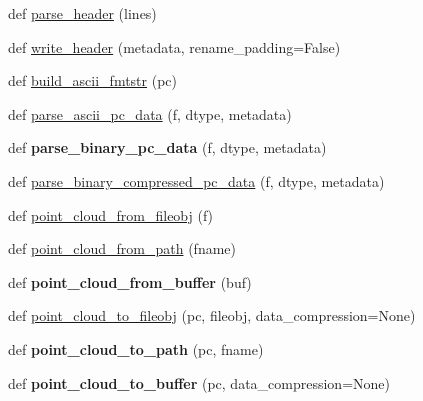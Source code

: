 \begin{DoxyCompactItemize}
\item 
def \hyperlink{namespacepypcd__hack_1_1pypcd_ad763a73fac8704a3ac3d501258bbfc2f}{parse\+\_\+header} (lines)
\item 
def \hyperlink{namespacepypcd__hack_1_1pypcd_adad732652b44e6880384410d0ef282ae}{write\+\_\+header} (metadata, rename\+\_\+padding=False)
\item 
def \hyperlink{namespacepypcd__hack_1_1pypcd_a6aa9a1eb4d943a7ea0cbd73bc7945ddf}{build\+\_\+ascii\+\_\+fmtstr} (pc)
\item 
def \hyperlink{namespacepypcd__hack_1_1pypcd_ab15f51bb43e0e29195936a5caf25bff7}{parse\+\_\+ascii\+\_\+pc\+\_\+data} (f, dtype, metadata)
\item 
\mbox{\label{namespacepypcd__hack_1_1pypcd_a7880813d7fc51625fe6ba19b18289789}} 
def {\bfseries parse\+\_\+binary\+\_\+pc\+\_\+data} (f, dtype, metadata)
\item 
def \hyperlink{namespacepypcd__hack_1_1pypcd_ae85e9dff84e32b410172653a14205f1e}{parse\+\_\+binary\+\_\+compressed\+\_\+pc\+\_\+data} (f, dtype, metadata)
\item 
def \hyperlink{namespacepypcd__hack_1_1pypcd_a082d05e46895d47fe7ce148f0b388ab5}{point\+\_\+cloud\+\_\+from\+\_\+fileobj} (f)
\item 
def \hyperlink{namespacepypcd__hack_1_1pypcd_af5959f034a9db1fd00fef3701280d699}{point\+\_\+cloud\+\_\+from\+\_\+path} (fname)
\item 
\mbox{\label{namespacepypcd__hack_1_1pypcd_a28a0218e89be867e1b38b5344a3d63e6}} 
def {\bfseries point\+\_\+cloud\+\_\+from\+\_\+buffer} (buf)
\item 
def \hyperlink{namespacepypcd__hack_1_1pypcd_a795df6c9f99ef82898730a9894b59283}{point\+\_\+cloud\+\_\+to\+\_\+fileobj} (pc, fileobj, data\+\_\+compression=None)
\item 
\mbox{\label{namespacepypcd__hack_1_1pypcd_aa7349265891cf775b4f0fe4b83ca6a10}} 
def {\bfseries point\+\_\+cloud\+\_\+to\+\_\+path} (pc, fname)
\item 
\mbox{\label{namespacepypcd__hack_1_1pypcd_aeadcf902e2c1191dbfffa0b856f5f359}} 
def {\bfseries point\+\_\+cloud\+\_\+to\+\_\+buffer} (pc, data\+\_\+compression=None)

\end{DoxyCompactItemize}
